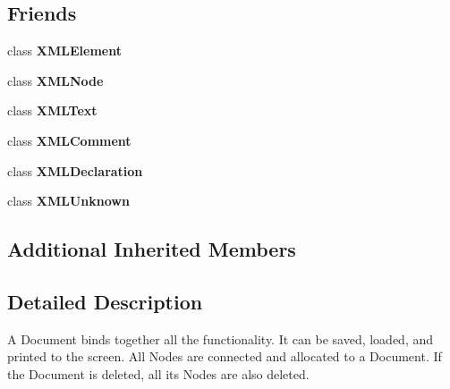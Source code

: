 \subsection*{Friends}
\begin{DoxyCompactItemize}
\item 
class {\bfseries X\+M\+L\+Element}\hypertarget{classtinyxml2_1_1XMLDocument_ac2fba9b6e452829dd892f7392c24e0eb}{}\label{classtinyxml2_1_1XMLDocument_ac2fba9b6e452829dd892f7392c24e0eb}

\item 
class {\bfseries X\+M\+L\+Node}\hypertarget{classtinyxml2_1_1XMLDocument_a8233f9dc4d61d90e93be2a3647c6d957}{}\label{classtinyxml2_1_1XMLDocument_a8233f9dc4d61d90e93be2a3647c6d957}

\item 
class {\bfseries X\+M\+L\+Text}\hypertarget{classtinyxml2_1_1XMLDocument_ae50b59416e98bbe7e4bc87df40092109}{}\label{classtinyxml2_1_1XMLDocument_ae50b59416e98bbe7e4bc87df40092109}

\item 
class {\bfseries X\+M\+L\+Comment}\hypertarget{classtinyxml2_1_1XMLDocument_acee9e261162d4236fb2c30312c54cd4c}{}\label{classtinyxml2_1_1XMLDocument_acee9e261162d4236fb2c30312c54cd4c}

\item 
class {\bfseries X\+M\+L\+Declaration}\hypertarget{classtinyxml2_1_1XMLDocument_a93d2c2c2db3973083b7d6e7f6f358160}{}\label{classtinyxml2_1_1XMLDocument_a93d2c2c2db3973083b7d6e7f6f358160}

\item 
class {\bfseries X\+M\+L\+Unknown}\hypertarget{classtinyxml2_1_1XMLDocument_a6946948274f7a02f5e69b5dbeaea9b35}{}\label{classtinyxml2_1_1XMLDocument_a6946948274f7a02f5e69b5dbeaea9b35}

\end{DoxyCompactItemize}
\subsection*{Additional Inherited Members}


\subsection{Detailed Description}
A Document binds together all the functionality. It can be saved, loaded, and printed to the screen. All Nodes are connected and allocated to a Document. If the Document is deleted, all its Nodes are also deleted. 


